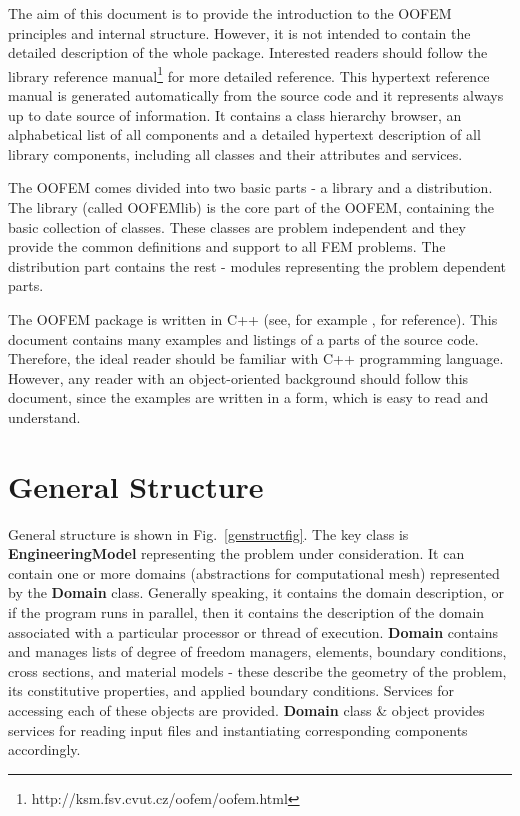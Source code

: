 \documentclass[a4paper]{article}
\newcommand{\class}[1]{{\bf #1}}
\newcommand{\refman}{\oofem library reference manual}
\begin{document}
The aim of this document is to provide the introduction to the OOFEM
principles and internal structure. However, it is not intended to
contain the detailed description of the whole package. Interested readers
should follow the \refman\footnote{http://ksm.fsv.cvut.cz/oofem/oofem.html} for more
detailed reference. This hypertext reference
manual is generated automatically from the source code and it
represents always up to date source of information. It contains a class
hierarchy browser, an alphabetical list of all components and a
detailed hypertext description of all library components, including
all classes and their attributes and services.


The OOFEM comes divided into two basic parts - a library and
a distribution. The library (called OOFEMlib) is the core part of the OOFEM, containing
the basic collection of classes. These classes are problem independent
and they provide the common definitions and support to all FEM
problems. The distribution part contains the rest - modules representing the problem dependent
parts. 

The OOFEM package is written in C++ (see, for example \cite{c++}, for reference). This 
document contains many examples and listings of a parts of the source
code. Therefore, the ideal reader should be familiar with C++ programming
language. However, any reader with an object-oriented background should
follow this document, since the examples are written in a form, which is 
easy to read and understand.

\section{General Structure}

General structure is shown in Fig.~\ref{genstructfig}.
The key class is \class{EngineeringModel} representing the problem
under consideration. It can contain one or more domains (abstractions
for computational mesh) represented by the \class{Domain} class.
Generally
speaking, it contains the domain description, or if the program runs in
parallel, then it contains the description of the domain associated
with a particular processor or thread of execution. \class{Domain} 
contains and manages lists of degree of freedom managers, elements, boundary
conditions, cross sections, and material models - these describe the geometry
of the problem, its constitutive properties, and applied boundary
conditions. Services for accessing each of these objects are
provided. 
\class{Domain} class \& object provides services for reading input
files and instantiating corresponding components accordingly. 
\end{document}
